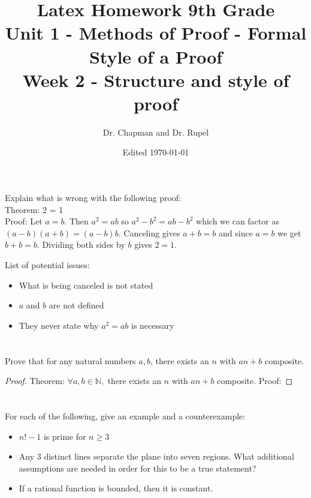 \documentclass{amsart}
\title{Latex Homework 9th Grade\\ Unit 1 - Methods of Proof - Formal Style of a Proof\\ Week 2 - Structure and style of proof}
\author{Dr. Chapman and Dr. Rupel}
\date{Edited \today}
\begin{document}
\maketitle

\section{}
    Explain what is wrong with the following proof:\\ Theorem: 2 = 1\\Proof: Let \(a = b\). Then \(a^2 = ab\) so \(a^2-b^2 = ab - b^2\) which we can factor as \((a-b)(a+b) = (a-b)b\). Canceling gives \(a+b = b\) and since \(a = b\) we get \(b+b = b\). Dividing both sides by \(b\) gives \(2 = 1\).


List of potential issues:
\begin{itemize}
\item  What is being canceled is not stated
\item \(a\) and \(b\) are not defined
\item They never state why \(a^2 = ab\) is necessary
\end{itemize}
\section{}
    Prove that for any natural numbers \(a,b\), there exists an \(n\) with \(an+b\) composite.
	\begin{proof}
	Theorem: $\forall a,b\in\mathbb{N},$ there exists an $n$ with $an+b$ composite.
	Proof: 
	\end{proof}
    
\section{}
    For each of the following, give an example and a counterexample:
    \begin{itemize}
        \item \(n!-1\) is prime for \(n \geq 3\)
        \item Any 3 distinct lines separate the plane into seven regions.  What additional assumptions are needed in order for this to be a true statement?
        \item If a rational function is bounded, then it is constant.
    \end{itemize}
    
\end{document}
